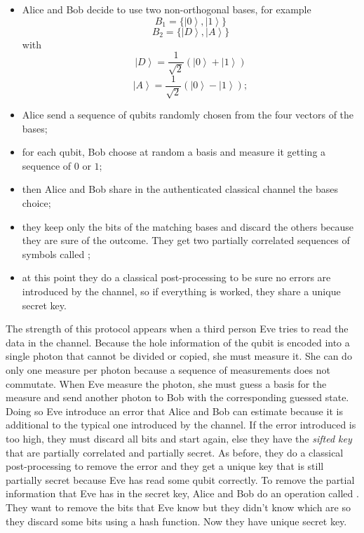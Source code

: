 \begin{itemize}
  \item Alice and Bob decide to use two non-orthogonal bases, for example
        \begin{equation}
          B_1 = \{\left|0\right>, \left|1\right>\}
        \end{equation}
        \begin{equation}
          B_2 = \{\left|D\right>, \left|A\right>\}
        \end{equation}
        with
        \begin{equation}
          \left|D\right> = \frac{1}{\sqrt{2}} (\left|0\right> + \left|1\right>)
        \end{equation}
        \begin{equation}
          \left|A\right> = \frac{1}{\sqrt{2}} (\left|0\right> - \left|1\right>);
        \end{equation}
  \item Alice send a sequence of qubits randomly chosen from the four vectors of the bases;
  \item for each qubit, Bob choose at random a basis and measure it getting a sequence of $0$ or $1$;
  \item then Alice and Bob share in the authenticated classical channel the bases choice;
  \item they keep only the bits of the matching bases and discard the others because they are sure of the outcome. They get two partially correlated sequences of symbols called ;
  \item at this point they do a classical post-processing to be sure no errors are introduced by the channel, so if everything is worked, they share a unique secret key.
\end{itemize}

The strength of this protocol appears when a third person Eve tries to read the data in the channel. Because the hole information of the qubit is encoded into a single photon that cannot be divided or copied, she must measure it. She can do only one measure per photon because a sequence of measurements does not commutate. When Eve measure the photon, she must guess a basis for the measure and send another photon to Bob with the corresponding guessed state. Doing so Eve introduce an error that Alice and Bob can estimate because it is additional to the typical one introduced by the channel. If the error introduced is too high, they must discard all bits and start again, else they have the \textit{sifted key} that are partially correlated and partially secret. As before, they do a classical post-processing to remove the error and they get a unique key that is still partially secret because Eve has read some qubit correctly. To remove the partial information that Eve has in the secret key, Alice and Bob do an operation called . They want to remove the bits that Eve know but they didn't know which are so they discard some bits using a hash function. Now they have unique secret key.

